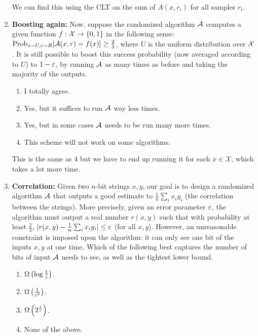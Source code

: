 \documentclass[11pt, svgnames]{article}
\begin{document}
\begin{enumerate}
We can find this using the CLT on the sum of $A(x,r_i)$ for all samples $r_i$.

\item {\bf Boosting again:} Now, suppose the randomized algorithm $\mathcal{A}$ computes a given function $f:\mathcal{X}\rightarrow \{0,1\}$ in the following sense: $\mathrm{Prob}_{x\sim U, r\sim R}[\mathcal{A}(x,r)=f(x)]\geq \frac{2}{3}$, where $U$ is the uniform distribution over $\mathcal{X}$. It is still possible to boost this success probability (now averaged according to $U$) to $1-\varepsilon$, by running $\mathcal{A}$ as many times as before and taking the majority of the outputs.     
\begin{enumerate}
\item I totally agree.
\item Yes, but it suffices to run $\mathcal{A}$ way less times.
\item Yes, but in some cases $\mathcal{A}$ needs to be run many more times.
\item This scheme will not work on some algorithms.
\end{enumerate}


This is the same as 4 but we have to end up running it for each $x\in \mathcal{X}$, which takes a lot more time.

\item {\bf Correlation:} Given two $n$-bit strings $x,y$, our goal is to design a randomized algorithm $\mathcal{A}$ that outputs a good estimate to $\frac{1}{n}\sum_i x_iy_i$ (the correlation between the strings). More precisely, given an error parameter $\varepsilon$, the algorithm must output a real number $r(x,y)$ such that with probability at least $\frac{2}{3}$, $|r(x,y)-\frac{1}{n}\sum_i x_iy_i|\leq \varepsilon$ (for all $x,y$). However, an unreasonable constraint is imposed upon the algorithm: it can only see one bit of the inputs $x,y$ at one time. Which of the following best captures the number of bits of input $\mathcal{A}$ needs to see, as well as the tightest lower bound.
\begin{enumerate}
\item $\Omega\left(\log\frac{1}{\varepsilon}\right)$. 
\item $\Omega\left(\frac{1}{\varepsilon^2}\right)$.
\item $\Omega\left(2^{\frac{1}{\varepsilon}}\right)$.
\item None of the above.
\end{enumerate}



\end{enumerate}
\end{document}
